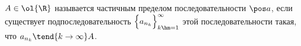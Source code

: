 
$A\in\ol{\R}$ называется частичным пределом последовательности
$\pos a$, если существует подпоследовательность
$\Big\{a_{n_k}\Big\}_{k\hm=1}^\infty$ этой последовательности такая, что $a_{n_k}\tend{k\to\infty}A$.
